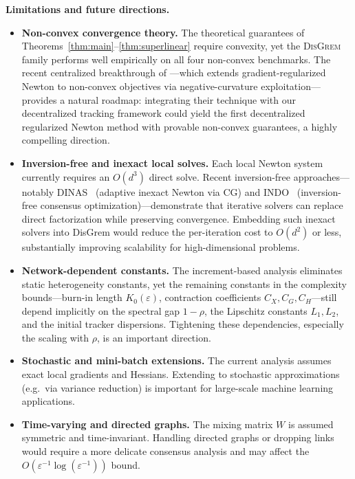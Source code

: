 \documentclass[10pt,twocolumn,letterpaper]{article}
\def\cO{O}%
\theoremstyle{compact}
\theoremstyle{compactremark}
\newcommand{\cO}{\mathcal{O}}
\begin{document}
	\noindent\textbf{Limitations and future directions.}\label{sec:conclusion}
	\begin{itemize}[leftmargin=1.2em,itemsep=2pt]
		\item \textbf{Non-convex convergence theory.}
		The theoretical guarantees of Theorems~\ref{thm:main}--\ref{thm:superlinear}
		require convexity, yet the \textsc{DisGrem} family performs
		well empirically on all four non-convex benchmarks.
		The recent centralized breakthrough of
		\citet{ding2025nonconvex}---which extends gradient-regularized
		Newton to non-convex objectives via negative-curvature
		exploitation---provides a natural roadmap:
		integrating their technique with our decentralized tracking
		framework could yield the first decentralized regularized
		Newton method with provable non-convex guarantees,
		a highly compelling direction.
		\item \textbf{Inversion-free and inexact local solves.}
		Each local Newton system currently requires an $\cO(d^3)$ direct
		solve.
		Recent inversion-free approaches---notably
		DINAS~\citep{crane2025dinas} (adaptive inexact Newton via CG)
		and INDO~\citep{yuan2023indo} (inversion-free consensus
		optimization)---demonstrate that iterative solvers can
		replace direct factorization while preserving convergence.
		Embedding such inexact solvers into DisGrem would reduce the
		per-iteration cost to $\cO(d^2)$ or less, substantially
		improving scalability for high-dimensional problems.
		\item \textbf{Network-dependent constants.}
		The increment-based analysis eliminates static heterogeneity
		constants, yet the remaining constants in the complexity
		bounds---burn-in length $K_0(\varepsilon)$, contraction
		coefficients $C_X, C_G, C_H$---still depend implicitly on
		the spectral gap $1{-}\rho$, the Lipschitz constants
		$L_1, L_2$, and the initial tracker dispersions.
		Tightening these dependencies, especially the scaling
		with $\rho$, is an important direction.
		\item \textbf{Stochastic and mini-batch extensions.}
		The current analysis assumes exact local gradients and Hessians.
		Extending to stochastic approximations (e.g.\ via variance reduction) is important
		for large-scale machine learning applications.
		\item \textbf{Time-varying and directed graphs.}
		The mixing matrix $W$ is assumed symmetric and time-invariant.
		Handling directed graphs or dropping links would require a more delicate consensus
		analysis and may affect the $\cO(\varepsilon^{-1}\log(\varepsilon^{-1}))$ bound.

\end{itemize}
\end{document}
